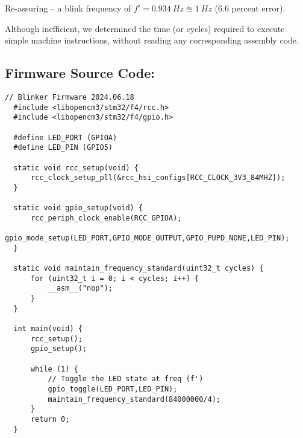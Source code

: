 \documentclass[a4paper,12pt]{article}   	%
\begin{document}
\begin{flushleft}
Re-assuring -- a blink frequency of $f' = 0.934\ Hz \approxeq 1\ Hz$ (6.6 percent error). 


Although inefficient, we determined the time (or cycles) required 
to execute simple machine instructions, without reading any corresponding assembly code.\\[0 ex]



\end{flushleft}

\subsection*{Firmware Source Code:}
\begin{lstlisting}[backgroundcolor = \color{beige}]
  // Blinker Firmware 2024.06.18
  #include <libopencm3/stm32/f4/rcc.h>
  #include <libopencm3/stm32/f4/gpio.h>
  
  #define LED_PORT (GPIOA)
  #define LED_PIN (GPIO5)
  
  static void rcc_setup(void) {
      rcc_clock_setup_pll(&rcc_hsi_configs[RCC_CLOCK_3V3_84MHZ]);
  }

  static void gpio_setup(void) {
      rcc_periph_clock_enable(RCC_GPIOA);
      gpio_mode_setup(LED_PORT,GPIO_MODE_OUTPUT,GPIO_PUPD_NONE,LED_PIN);
  }
  
  static void maintain_frequency_standard(uint32_t cycles) {
      for (uint32_t i = 0; i < cycles; i++) {
          __asm__("nop");
      }
  }
  
  int main(void) {
      rcc_setup();
      gpio_setup();
  
      while (1) {
          // Toggle the LED state at freq (f')
          gpio_toggle(LED_PORT,LED_PIN);
          maintain_frequency_standard(84000000/4);
      }
      return 0;
  }


\end{lstlisting}
\end{document}
